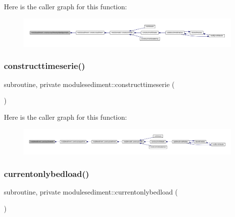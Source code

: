 Here is the caller graph for this function\+:\nopagebreak
\begin{figure}[H]
\begin{center}
\leavevmode
\includegraphics[width=350pt]{namespacemodulesediment_a4fcfee70467ab31177134369a945bf94_icgraph}
\end{center}
\end{figure}
\mbox{\label{namespacemodulesediment_aafc201d260f566a644259cfca436de86}} 
\subsubsection{\texorpdfstring{constructtimeserie()}{constructtimeserie()}}
{\footnotesize\ttfamily subroutine, private modulesediment\+::constructtimeserie (\begin{DoxyParamCaption}{ }\end{DoxyParamCaption})\hspace{0.3cm}{\ttfamily [private]}}

Here is the caller graph for this function\+:\nopagebreak
\begin{figure}[H]
\begin{center}
\leavevmode
\includegraphics[width=350pt]{namespacemodulesediment_aafc201d260f566a644259cfca436de86_icgraph}
\end{center}
\end{figure}
\mbox{\label{namespacemodulesediment_a099f230f690695fa4061449e8880d0e7}} 
\subsubsection{\texorpdfstring{currentonlybedload()}{currentonlybedload()}}
{\footnotesize\ttfamily subroutine, private modulesediment\+::currentonlybedload (\begin{DoxyParamCaption}{ }\end{DoxyParamCaption})\hspace{0.3cm}{\ttfamily [private]}}

